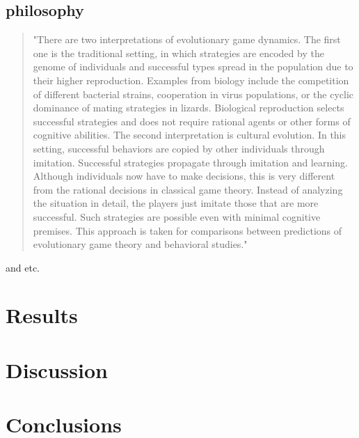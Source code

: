 \documentclass[journal,article,accept,oneauthors,pdftex,10pt,a4paper]{mdpi}
\begin{document}
\subsection{philosophy}

\begin{quote}"There are two interpretations of evolutionary game dynamics. The first one is the traditional setting, in which strategies are encoded by the genome of individuals and successful types spread in the population due to their higher reproduction. Examples from biology include the competition of different bacterial strains, cooperation in virus populations, or the cyclic dominance of mating strategies in lizards. Biological reproduction selects successful strategies and does not require rational agents or other forms of cognitive abilities.
The second interpretation is cultural evolution. In this setting, successful behaviors are copied by other individuals through imitation. Successful strategies propagate through imitation and learning. Although individuals now have to make decisions, this is very different from the rational decisions in classical game theory. Instead of analyzing the situation in detail, the players just imitate those that are more successful. Such strategies are possible even with minimal cognitive premises. This approach is taken for comparisons between predictions of evolutionary game theory and behavioral studies."\cite{stochastic1}\end{quote}
and etc.
\section{Results}



\section{Discussion}

\section{Conclusions}


\vspace{6pt} 


\end{document}
